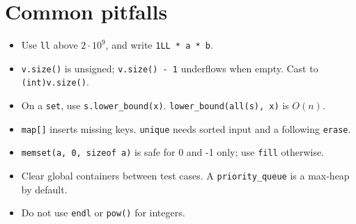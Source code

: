 \section{Common pitfalls}
\begin{itemize}
\item Use \texttt{ll} above $2 \cdot 10^9$, and write \texttt{1LL * a * b}.
\item \texttt{v.size()} is unsigned; \texttt{v.size() - 1} underflows when empty. Cast to \texttt{(int)v.size()}.
\item On a \texttt{set}, use \texttt{s.lower\_bound(x)}. \texttt{lower\_bound(all(s), x)} is $O(n)$.
\item \texttt{map[]} inserts missing keys. \texttt{unique} needs sorted input and a following \texttt{erase}.
\item \texttt{memset(a, 0, sizeof a)} is safe for 0 and -1 only; use \texttt{fill} otherwise.
\item Clear global containers between test cases. A \texttt{priority\_queue} is a max-heap by default.
\item Do not use \texttt{endl} or \texttt{pow()} for integers.
\end{itemize}
